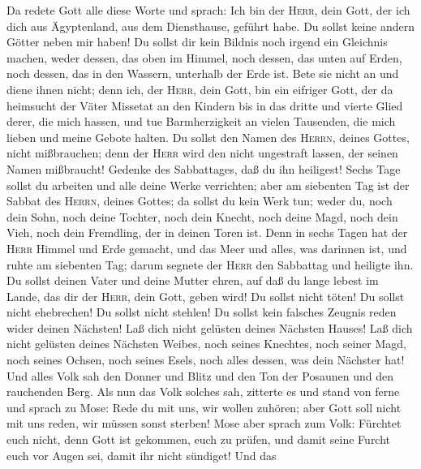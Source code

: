  Da redete Gott alle diese Worte und sprach:
 Ich bin der \textsc{Herr}, dein Gott, der ich dich aus
Ägyptenland, aus dem Diensthause, geführt habe.  Du sollst
keine andern Götter neben mir haben!  Du sollst dir kein
Bildnis noch irgend ein Gleichnis machen, weder dessen, das oben im
Himmel, noch dessen, das unten auf Erden, noch dessen, das in den
Wassern, unterhalb der Erde ist.  Bete sie nicht an und
diene ihnen nicht; denn ich, der \textsc{Herr}, dein Gott, bin ein
eifriger Gott, der da heimsucht der Väter Missetat an den Kindern bis in
das dritte und vierte Glied derer, die mich hassen,  und
tue Barmherzigkeit an vielen Tausenden, die mich lieben und meine Gebote
halten.  Du sollst den Namen des \textsc{Herrn}, deines
Gottes, nicht mißbrauchen; denn der \textsc{Herr} wird den nicht
ungestraft lassen, der seinen Namen mißbraucht!  Gedenke
des Sabbattages, daß du ihn heiligest!  Sechs Tage sollst
du arbeiten und alle deine Werke verrichten;  aber am
siebenten Tag ist der Sabbat des \textsc{Herrn}, deines Gottes; da
sollst du kein Werk tun; weder du, noch dein Sohn, noch deine Tochter,
noch dein Knecht, noch deine Magd, noch dein Vieh, noch dein Fremdling,
der in deinen Toren ist.  Denn in sechs Tagen hat der
\textsc{Herr} Himmel und Erde gemacht, und das Meer und alles, was
darinnen ist, und ruhte am siebenten Tag; darum segnete der
\textsc{Herr} den Sabbattag und heiligte ihn.  Du sollst
deinen Vater und deine Mutter ehren, auf daß du lange lebest im Lande,
das dir der \textsc{Herr}, dein Gott, geben wird!  Du
sollst nicht töten!  Du sollst nicht ehebrechen!
 Du sollst nicht stehlen!  Du sollst kein
falsches Zeugnis reden wider deinen Nächsten!  Laß dich
nicht gelüsten deines Nächsten Hauses! Laß dich nicht gelüsten deines
Nächsten Weibes, noch seines Knechtes, noch seiner Magd, noch seines
Ochsen, noch seines Esels, noch alles dessen, was dein Nächster hat!
 Und alles Volk sah den Donner und Blitz und den Ton der
Posaunen und den rauchenden Berg. Als nun das Volk solches sah, zitterte
es und stand von ferne  und sprach zu Mose: Rede du mit
uns, wir wollen zuhören; aber Gott soll nicht mit uns reden, wir müssen
sonst sterben!  Mose aber sprach zum Volk: Fürchtet euch
nicht, denn Gott ist gekommen, euch zu prüfen, und damit seine Furcht
euch vor Augen sei, damit ihr nicht sündiget!  Und das
